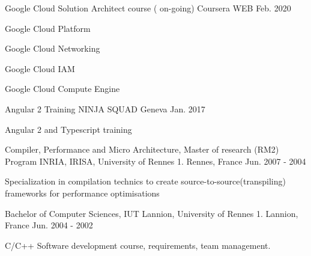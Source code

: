 

\begin{cventries}
\cventry
{Google Cloud Solution Architect course ( on-going)} %
{Coursera} %
{WEB} %
{Feb. 2020} %
{
	\begin{cvitems} %
		\item {Google Cloud Platform}
		\item {Google Cloud Networking}
		\item {Google Cloud IAM}
		\item {Google Cloud Compute Engine}
	\end{cvitems}
}\cventry
{Angular 2 Training} %
{NINJA SQUAD} %
{Geneva} %
{Jan. 2017} %
{
	\begin{cvitems} %
		\item {Angular 2 and Typescript training}
	\end{cvitems}
}
  \cventry
    {Compiler, Performance and Micro Architecture, Master of research (RM2) Program} %
    {INRIA, IRISA, University of Rennes 1. } %
    {Rennes, France} %
    {Jun. 2007 - 2004} %
    {
      \begin{cvitems} %
        \item {Specialization in compilation technics to create source-to-source(transpiling) frameworks for performance optimisations}
      \end{cvitems}
    }
\cventry
{Bachelor of Computer Sciences, } %
{IUT Lannion, University of Rennes 1. } %
{Lannion, France} %
{Jun. 2004 - 2002} %
{
	\begin{cvitems} %
			\item { C/C++ Software development course, requirements, team management. }
	\end{cvitems}
}

\end{cventries}

